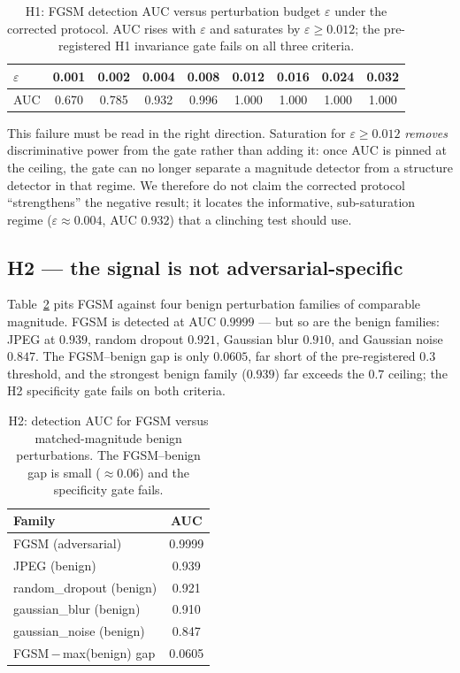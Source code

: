 \documentclass[../ppgc-tese.tex]{subfiles}
\begin{document}
\begin{table}[ht]
  \centering
  \caption{H1: FGSM detection AUC versus perturbation budget $\varepsilon$ under the
  corrected protocol. AUC rises with $\varepsilon$ and saturates by
  $\varepsilon\geq0.012$; the pre-registered H1 invariance gate fails on all three
  criteria.}
  \label{tab:adv-h1}
  \begin{tabular}{lcccccccc}
    \toprule
    $\varepsilon$ & 0.001 & 0.002 & 0.004 & 0.008 & 0.012 & 0.016 & 0.024 & 0.032 \\
    \midrule
    AUC & 0.670 & 0.785 & 0.932 & 0.996 & 1.000 & 1.000 & 1.000 & 1.000 \\
    \bottomrule
  \end{tabular}
\end{table}

This failure must be read in the right direction. Saturation for
$\varepsilon\geq0.012$ \emph{removes} discriminative power from the gate rather than
adding it: once AUC is pinned at the ceiling, the gate can no longer separate a
magnitude detector from a structure detector in that regime. We therefore do not
claim the corrected protocol ``strengthens'' the negative result; it locates the
informative, sub-saturation regime ($\varepsilon\approx0.004$, AUC $0.932$) that a
clinching test should use.

\subsection{H2 --- the signal is not adversarial-specific}
Table~\ref{tab:adv-h2} pits FGSM against four benign perturbation families of
comparable magnitude. FGSM is detected at AUC $0.9999$ --- but so are the benign
families: JPEG at $0.939$, random dropout $0.921$, Gaussian blur $0.910$, and
Gaussian noise $0.847$. The FGSM--benign gap is only $0.0605$, far short of the
pre-registered $0.3$ threshold, and the strongest benign family ($0.939$) far
exceeds the $0.7$ ceiling; the H2 specificity gate fails on both criteria.

\begin{table}[ht]
  \centering
  \caption{H2: detection AUC for FGSM versus matched-magnitude benign perturbations.
  The FGSM--benign gap is small ($\approx0.06$) and the specificity gate fails.}
  \label{tab:adv-h2}
  \begin{tabular}{lc}
    \toprule
    Family & AUC \\
    \midrule
    FGSM (adversarial)       & 0.9999 \\
    JPEG (benign)            & 0.939 \\
    random\_dropout (benign) & 0.921 \\
    gaussian\_blur (benign)  & 0.910 \\
    gaussian\_noise (benign) & 0.847 \\
    \midrule
    FGSM\,$-$\,max(benign) gap & 0.0605 \\
    \bottomrule
  \end{tabular}
\end{table}
\end{document}
